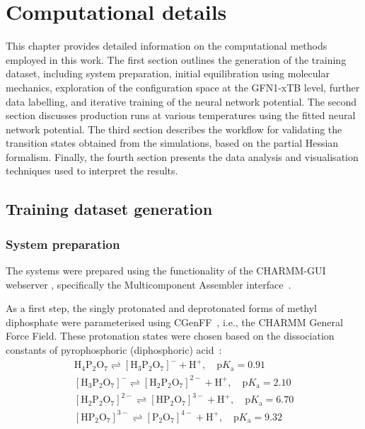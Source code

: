\chapter{Computational details}
This chapter provides detailed information on the computational methods employed in this work. The first section outlines the generation of the training dataset, including system preparation, initial equilibration using molecular mechanics, exploration of the configuration space at the GFN1-xTB level, further data labelling, and iterative training of the neural network potential. The second section discusses production runs at various temperatures using the fitted neural network potential. The third section describes the workflow for validating the transition states obtained from the simulations, based on the partial Hessian formalism. Finally, the fourth section presents the data analysis and visualisation techniques used to interpret the results.


\section{Training dataset generation}

\subsection{System preparation}
The systems were prepared using the functionality of the CHARMM-GUI webserver \citep{joCHARMMGUIWebbasedGraphical2008}, specifically the Multicomponent Assembler interface~\citep{kernCHARMMGUIMulticomponentAssembler2024}.

As a first step, the singly protonated and deprotonated forms of methyl diphosphate were parameterised using CGenFF~\citep{kimCHARMMGUILigandReader2017}, i.e., the CHARMM General Force Field. These protonation states were chosen based on the dissociation constants of pyrophosphoric (diphosphoric) acid~\citep{haynesCRCHandbookChemistry2016}:
\begin{align*}
    \mathrm{H_4P_2O_7} \rightleftharpoons \mathrm{[H_3P_2O_7]^-} + \mathrm{H^+},\quad \mathrm{p}K_\mathrm{a} = 0.91 \\
    \mathrm{[H_3P_2O_7]^-} \rightleftharpoons \mathrm{[H_2P_2O_7]^{2-}} + \mathrm{H^+},\quad \mathrm{p}K_\mathrm{a} = 2.10 \\
    \mathrm{[H_2P_2O_7]^{2-}} \rightleftharpoons \mathrm{[HP_2O_7]^{3-}} + \mathrm{H^+},\quad \mathrm{p}K_\mathrm{a} = 6.70 \\
    \mathrm{[HP_2O_7]^{3-}} \rightleftharpoons \mathrm{[P_2O_7]^{4-}} + \mathrm{H^+},\quad \mathrm{p}K_\mathrm{a} = 9.32
\end{align*}


